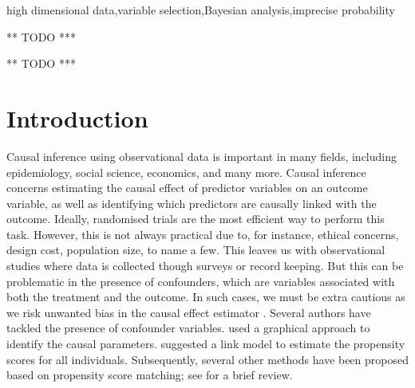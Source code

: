 \documentclass[preprint,12pt]{elsarticle}
\begin{document}
\begin{frontmatter}
\begin{keyword}
  high dimensional data\sep variable selection\sep Bayesian analysis\sep imprecise probability
\end{keyword}

\begin{highlights}
\item *** TODO ***
\item *** TODO ***
\end{highlights}

\end{frontmatter}

\section{Introduction}\label{sec:intro}

Causal inference using observational data is important in
many fields, including epidemiology, social science, economics, and many more.
Causal inference concerns estimating the causal
effect of predictor variables on an outcome variable,
as well as identifying which predictors are causally linked with the outcome.
Ideally,
randomised trials are the most efficient way to perform this task.
However, this is not always practical due to, for instance, ethical 
concerns, design cost, population size, to name a few. This
leaves us with observational studies
where data is collected though surveys or record keeping. But this
can be problematic in the presence of confounders,
which are variables associated with both the treatment and the outcome.
In such cases, we must be extra cautious as we risk
unwanted bias in the causal effect estimator \citep{rosenbaum83}.
Several authors have tackled the presence of
confounder variables. 
 used a graphical
approach to identify the causal parameters.
 suggested a link model to estimate
the propensity scores for all individuals. Subsequently, several other
methods have been proposed based on propensity score matching;
see \citep{winship99,stuart10} for a brief review.
\end{document}
